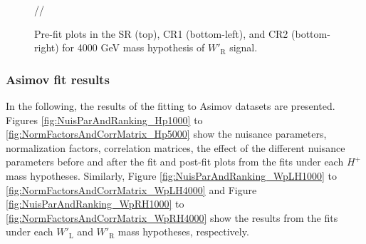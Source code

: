 \begin{figure}[H]
  \centering
  //
  \caption{Pre-fit plots in the SR (top), CR1 (bottom-left), and CR2 (bottom-right) for 4000 GeV mass hypothesis of $W'_{\text{R}}$ signal.}
  \label{fig:Prefit_WpRH4000_Asimov}
\end{figure}

\subsubsection{Asimov fit results}
\label{subsubsec:AsimovFit}
In the following, the results of the fitting to Asimov datasets are presented. Figures \ref{fig:NuisParAndRanking_Hp1000} to \ref{fig:NormFactorsAndCorrMatrix_Hp5000} show the nuisance parameters, normalization factors, correlation matrices, the effect of the different nuisance parameters before and after the fit and post-fit plots from the fits under each $H^{+}$ mass hypotheses. Similarly, Figure \ref{fig:NuisParAndRanking_WpLH1000} to \ref{fig:NormFactorsAndCorrMatrix_WpLH4000} and Figure \ref{fig:NuisParAndRanking_WpRH1000} to \ref{fig:NormFactorsAndCorrMatrix_WpRH4000} show the results from the fits under each $W'_{\text{L}}$ and $W'_{\text{R}}$ mass hypotheses, respectively.

